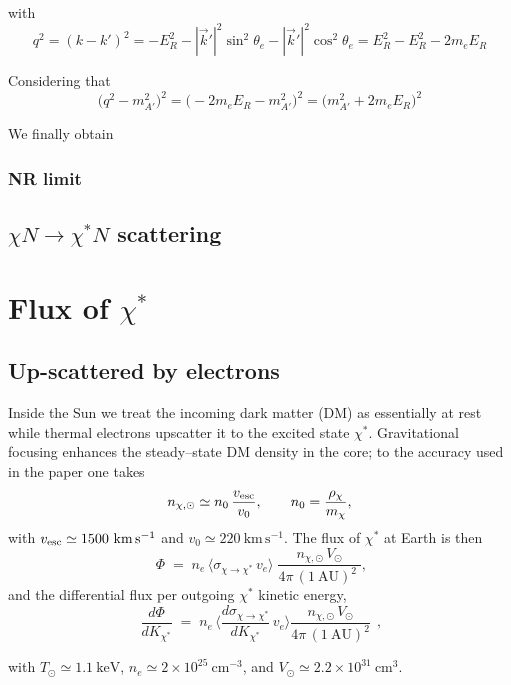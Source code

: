 \documentclass[13.1pt, letterpaper, twoside]{article}
\begin{document}
with 
\[
q^2 = (k - k')^2 = -E_R^2 - |\vec{k}'|^2 \sin^2\theta_e - |\vec{k}'|^2 \cos^2\theta_e
= E_R^2 - E_R^2 - 2 m_e E_R 
\]

Considering that
\[
\big(q^2 - m_{A'}^2\big)^2 = \big(-2 m_e E_R - m_{A'}^2\big)^2
= \big(m_{A'}^2 + 2 m_e E_R\big)^2 
\]

We finally obtain

\subsubsection{NR limit}

\subsection{$\chi N \to \chi^\ast N$ scattering}

\section{Flux of $\chi^{\ast}$}

\subsection{Up-scattered by electrons}

Inside the Sun we treat the incoming dark matter (DM) as essentially at rest while thermal electrons upscatter it to the excited state \(\chi^\ast\).
Gravitational focusing enhances the steady--state DM density in the core; to the accuracy used in the paper one takes
\[
n_{\chi,\odot}\simeq n_0\,\frac{v_{\rm esc}}{v_0},\qquad
n_0=\frac{\rho_\chi}{m_\chi},
\]
with \(v_{\rm esc}\simeq 1500~\mathrm{km\,s^{-1}}\) and \(v_0\simeq 220~\mathrm{km\,s^{-1}}\).
The flux of \(\chi^\ast\) at Earth is then
\[
\;
\Phi \;=\; n_e\,\big\langle\sigma_{\chi\to\chi^\ast}\,v_e\big\rangle\;
\frac{n_{\chi,\odot}\,V_\odot}{4\pi\,(1~\mathrm{AU})^2
\;},
\]
and the differential flux per outgoing \(\chi^\ast\) kinetic energy,
\begin{equation}
    \boxed{\;
    \frac{d\Phi}{dK_{\chi^\ast}}
    \;=\; n_e\,
    \Big\langle \frac{d\sigma_{\chi\to\chi^\ast}}{dK_{\chi^\ast}}\,v_e\Big\rangle
    \frac{n_{\chi,\odot}\,V_\odot}{4\pi\,(1~\mathrm{AU})^2}\,}\; ,
    \label{fluxdiff}
\end{equation}

with \(T_\odot\simeq 1.1~\mathrm{keV}\), \(n_e\simeq 2\times 10^{25}~\mathrm{cm^{-3}}\), and \(V_\odot\simeq 2.2\times 10^{31}~\mathrm{cm^3}\).
\end{document}
